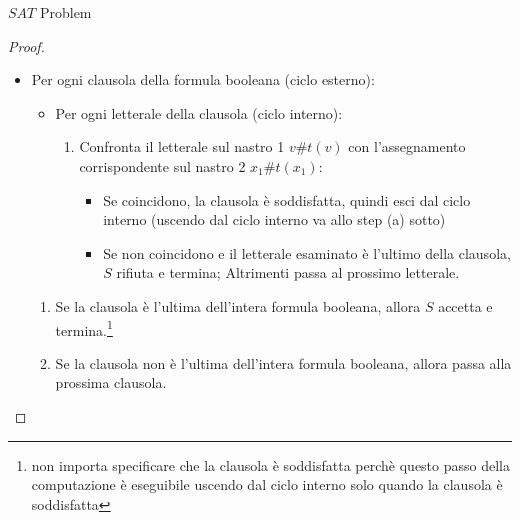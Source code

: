 \documentclass{article}  %
\theoremstyle{definition}
\begin{document}
\begin{theorem}{$SAT$ Problem}
\begin{proof}
\begin{enumerate}
			      \begin{itemize}
				      \item Per ogni clausola della formula booleana (ciclo esterno):

				            \begin{itemize}
					            \item Per ogni letterale della clausola (ciclo interno):
					                  \begin{enumerate}
						                  \item Confronta il letterale sul nastro 1 $v\#t(v)$ con l'assegnamento corrispondente sul nastro 2 $x_1\#t(x_1)$:
						                        \begin{itemize}
							                        \item Se coincidono, la clausola è soddisfatta, quindi esci dal ciclo interno (uscendo dal ciclo interno va allo step (a) sotto)
							                        \item Se non coincidono e il letterale esaminato è l'ultimo della clausola, $S$ rifiuta e termina; Altrimenti passa al prossimo letterale.
						                        \end{itemize}
					                  \end{enumerate}
				            \end{itemize}
				            \begin{enumerate}
					            \item Se la clausola è l'ultima dell'intera formula booleana, allora $S$ accetta e termina.\footnote{non importa specificare che la clausola è soddisfatta perchè questo passo
						                  della computazione è eseguibile uscendo dal ciclo interno solo quando la clausola è soddisfatta}
					            \item Se la clausola non è l'ultima dell'intera formula booleana, allora passa alla prossima clausola.
				            \end{enumerate}
			      \end{itemize}



\end{enumerate}
\end{proof}
\end{theorem}
\end{document}

